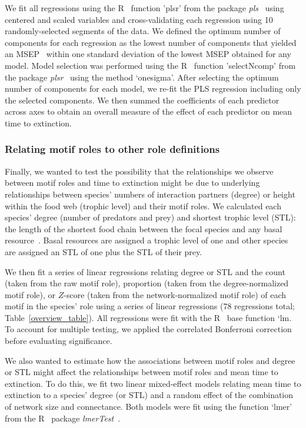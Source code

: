 \documentclass[12pt]{article}
\begin{document}
\begin{spacing}{2.0}
			
			We fit all regressions using the R~\citep{R} function 'plsr' from the package \emph{pls}~\citep{pls} using centered and scaled variables and cross-validating each regression using 10 randomly-selected segments of the data.
            We defined the optimum number of components for each regression as the lowest number of components that yielded an MSEP~\citep{Mevik2004} within one standard deviation of the lowest MSEP obtained for any model.
			Model selection was performed using the R~\citep{R} function 'selectNcomp' from the package \emph{plsr}~\citep{pls} using the method `onesigma'.
			After selecting the optimum number of components for each model, we re-fit the PLS regression including only the selected components. 
			We then summed the coefficients of each predictor across axes to obtain an overall measure of the effect of each predictor on mean time to extinction.


		\subsubsection*{Relating motif roles to other role definitions}
		
			Finally, we wanted to test the possibility that the relationships we observe between motif roles and time to extinction might be due to underlying relationships between species' numbers of interaction partners (degree) or height within the food web (trophic level) and their motif roles.
			We calculated each species' degree (number of predators and prey) and shortest trophic level (STL): the length of the shortest food chain between the focal species and any basal resource~\citep{Hairston1993}. 
            Basal resources are assigned a trophic level of one and other species are assigned an STL of one plus the STL of their prey.
			

            We then fit a series of linear regressions relating degree or STL and the count (taken from the raw motif role), proportion (taken from the degree-normalized motif role), or $Z$-score (taken from the network-normalized motif role) of each motif in the species' role using a series of linear regressions (78 regressions total; Table~\ref{overview_table}).
			All regressions were fit with the R~\citep{R} base function `lm.
            To account for multiple testing, we applied the correlated Bonferroni correction~\citep{Drezner2016} before evaluating significance.


            We also wanted to estimate how the associations between motif roles and degree or STL might affect the relationships between motif roles and mean time to extinction.
            To do this, we fit two linear mixed-effect models relating mean time to extinction to a species' degree (or STL) and a random effect of the combination of network size and connectance. 
            Both models were fit using the function `lmer' from the R~\citep{R} package \emph{lmerTest}~\citep{lmerTest}.



\end{spacing}
\end{document}
